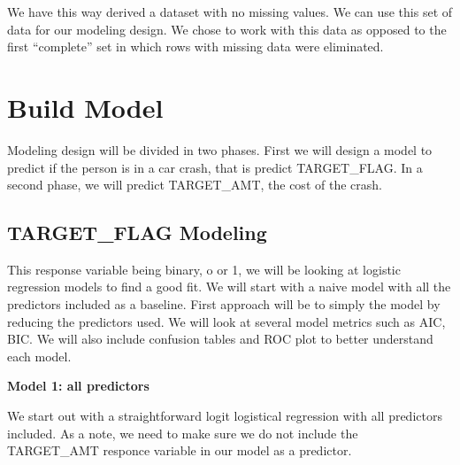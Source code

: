 \documentclass[]{article}
\begin{document}
We have this way derived a dataset with no missing values. We can use
this set of data for our modeling design. We chose to work with this
data as opposed to the first ``complete'' set in which rows with missing
data were eliminated.

\hypertarget{build-model}{%
\section{Build Model}\label{build-model}}

Modeling design will be divided in two phases. First we will design a
model to predict if the person is in a car crash, that is predict
TARGET\_FLAG. In a second phase, we will predict TARGET\_AMT, the cost
of the crash.

\hypertarget{target_flag-modeling}{%
\subsection{TARGET\_FLAG Modeling}\label{target_flag-modeling}}

This response variable being binary, o or 1, we will be looking at
logistic regression models to find a good fit. We will start with a
naive model with all the predictors included as a baseline. First
approach will be to simply the model by reducing the predictors used. We
will look at several model metrics such as AIC, BIC. We will also
include confusion tables and ROC plot to better understand each model.

\textbf{Model 1: all predictors}

We start out with a straightforward logit logistical regression with all
predictors included. As a note, we need to make sure we do not include
the TARGET\_AMT responce variable in our model as a predictor.
\end{document}

